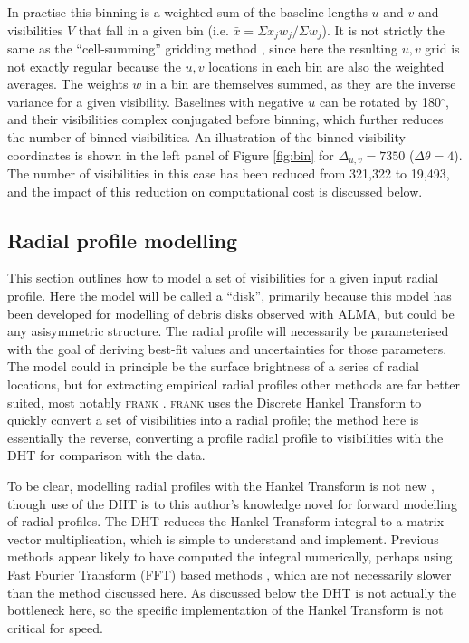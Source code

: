 \documentclass[fleqn,usenatbib]{rasti}
\begin{document}
In practise this binning is a weighted sum of the baseline lengths $u$ and $v$ and visibilities $V$ that fall in a given bin (i.e. $\bar{x} = \Sigma x_j w_j / \Sigma w_j$). It is not strictly the same as the ``cell-summing'' gridding method \citep[e.g.][]{1974AJ.....79...11T}, since here the resulting $u,v$ grid is not exactly regular because the $u,v$ locations in each bin are also the weighted averages. The weights $w$ in a bin are themselves summed, as they are the inverse variance for a given visibility. Baselines with negative $u$ can be rotated by 180$^\circ$, and their visibilities complex conjugated before binning, which further reduces the number of binned visibilities. An illustration of the binned visibility coordinates is shown in the left panel of Figure \ref{fig:bin} for $\Delta_{u,v}=7350$ ($\Delta \theta = 4$\arcsec). The number of visibilities in this case has been reduced from 321,322 to 19,493, and the impact of this reduction on computational cost is discussed below.

\subsection{Radial profile modelling}

This section outlines how to model a set of visibilities for a given input radial profile. Here the model will be called a ``disk'', primarily because this model has been developed for modelling of debris disks observed with ALMA, but could be any asisymmetric structure. The radial profile will necessarily be parameterised with the goal of deriving best-fit values and uncertainties for those parameters. The model could in principle be the surface brightness of a series of radial locations, but for extracting empirical radial profiles other methods are far better suited, most notably \textsc{frank} \citep{2020MNRAS.tmp.1491J}. \textsc{frank} uses the Discrete Hankel Transform to quickly convert a set of visibilities into a radial profile; the method here is essentially the reverse, converting a profile radial profile to visibilities with the DHT for comparison with the data.

To be clear, modelling radial profiles with the Hankel Transform is not new \citep[e.g.][]{2014A&A...563A.136M,2016ApJ...818L..16Z,2018ApJ...869L..48G}, though use of the DHT is to this author's knowledge novel for forward modelling of radial profiles. The DHT reduces the Hankel Transform integral to a matrix-vector multiplication, which is simple to understand and implement. Previous methods appear likely to have computed the integral numerically, perhaps using Fast Fourier Transform (FFT) based methods \citep[e.g.][]{2000MNRAS.312..257H}, which are not necessarily slower than the method discussed here. As discussed below the DHT is not actually the bottleneck here, so the specific implementation of the Hankel Transform is not critical for speed.
\end{document}
